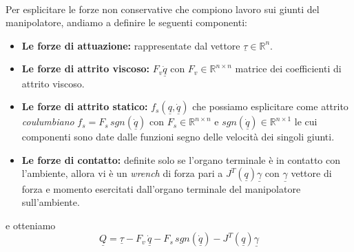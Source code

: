 \paragraph{}
Per esplicitare le forze non conservative che compiono lavoro sui giunti del manipolatore, andiamo a definire le seguenti componenti:
\begin{itemize}
	\item \textbf{Le forze di attuazione:} rappresentate dal vettore $\underline{\tau} \in \mathbb{R}^n$.
	\item \textbf{Le forze di attrito viscoso:} $F_v \underline{\dot{q}}$ con $F_v \in \mathbb{R}^{n \times n}$ matrice dei coefficienti di attrito viscoso.
	\item \textbf{Le forze di attrito statico:} $f_s(\underline{q}, \underline{\dot{q}})$ che possiamo esplicitare come attrito \emph{coulumbiano} $f_s = F_s\, sgn(\underline{\dot{q}})$ con $F_s \in \mathbb{R}^{n \times n}$ e $sgn(\underline{\dot{q}}) \in \mathbb{R}^{n \times 1}$ le cui componenti sono date dalle funzioni segno delle velocità dei singoli giunti.
	\item \textbf{Le forze di contatto:} definite solo se l'organo terminale è in contatto con l'ambiente, allora vi è un \emph{wrench} di forza pari a $J^T(\underline{q})\underline{\gamma}$ con $\underline{\gamma}$ vettore di forza e momento esercitati dall'organo terminale del manipolatore sull'ambiente.  
\end{itemize}
e otteniamo
\begin{equation}
	\underline{Q} = \underline{\tau} - F_v \, \underline{\dot{q}} - F_s\, sgn(\underline{\dot{q}}) - J^T(\underline{q})\underline{\gamma}
\end{equation}

